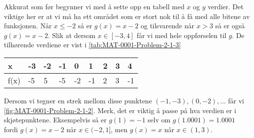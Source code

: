 \documentclass[a4paper,11pt]{article}
\begin{document}
\begin{solution}
    Akkurat som før begynner vi med å sette opp en tabell med $x$ og $y$ verdier. 
    Det viktige her er at vi må ha ett området som er stort nok til å få med alle 
    bitene av funksjonen. Når $x \leq -2$ så er $g(x) = x - 2$ og tilsvarende når
    $x > 3$ så er også $g(x) = x - 2$. Slik at dersom $x \in [-3, 4]$ får vi med
    hele oppførselen til $g$. De tilhørende verdiene er vist i 
    \cref{tab:MAT-0001-Problem-2-1-3}
    
    \begin{center}
        \label{tab:MAT-0001-Problem-2-1-3}
        \begin{tabular}{h | j j j j j j j j }
            \toprule
               x  & -3 & -2 & -1 & 0 & 1 & \phantom{-}2 & \phantom{-}3 & \phantom{-}4  \\
            \midrule
             f(x) & -5 & 5 & -5 & -2 & -1 & 2 & 3 & -1 \\ 
            \bottomrule
        \end{tabular}
    \end{center}
    
    Dersom vi tegner en strek mellom disse punktene $(-1, -3), (0,-2), \ldots$
    får vi \cref{fig:MAT-0001-Problem-2-1-2}. Merk, det er viktig å passe på hva
    verdien er i skjøtepunktene. Eksempelvis så er $g(1) = -1$ selv om $g(\num{1.0001}) = \num{1.0001}$
    fordi $g(x) = x - 2$ når $x \in (-2,1]$, men $g(x) = x$ når $x \in (1,3)$.
\end{solution}

\end{document}
